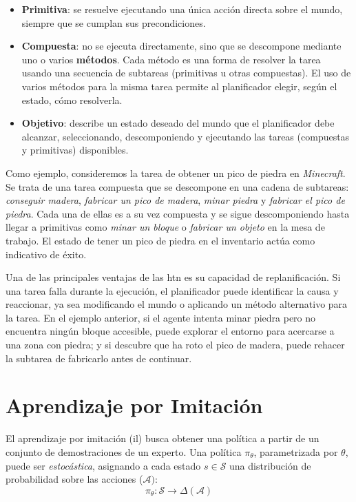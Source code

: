 \begin{itemize}
    \item \textbf{Primitiva}: se resuelve ejecutando una única acción directa sobre el mundo, 
    siempre que se cumplan sus precondiciones.

    \item \textbf{Compuesta}: no se ejecuta directamente, sino que se descompone mediante uno o varios \textbf{métodos}. 
    Cada método es una forma de resolver la tarea usando una secuencia de subtareas (primitivas u otras compuestas). 
    El uso de varios métodos para la misma tarea permite al \gls{planificador} elegir, según el estado, cómo resolverla.

    \item \textbf{Objetivo}: describe un estado deseado del mundo que el \gls{planificador} debe alcanzar, seleccionando, 
    descomponiendo y ejecutando las tareas (compuestas y primitivas) disponibles.
\end{itemize}

Como ejemplo, consideremos la tarea de obtener un pico de piedra en \textit{Minecraft}.
Se trata de una tarea compuesta que se descompone en una cadena de subtareas: \emph{conseguir madera}, 
\emph{fabricar un pico de madera}, \emph{minar piedra} y \emph{fabricar el pico de piedra}.
Cada una de ellas es a su vez compuesta y se sigue descomponiendo hasta llegar a primitivas como \emph{minar un bloque} o 
\emph{fabricar un objeto} en la mesa de trabajo.
El estado de tener un pico de piedra en el inventario actúa como indicativo de éxito.

Una de las principales ventajas de las \gls{htn} es su capacidad de replanificación.
Si una tarea falla durante la ejecución, el \gls{planificador} puede identificar la causa y reaccionar, 
ya sea modificando el mundo o aplicando un método alternativo para la tarea.
En el ejemplo anterior, si el agente intenta minar piedra pero no encuentra ningún bloque accesible, 
puede explorar el entorno para acercarse a una zona con piedra; y si descubre que ha roto el pico de madera, 
puede rehacer la subtarea de fabricarlo antes de continuar.

\section{Aprendizaje por Imitación}
\label{sec:marco-il}
El aprendizaje por imitación (\gls{il}) busca obtener una \gls{política} a partir de un conjunto de demostraciones de un experto.
Una \gls{política} $\pi_\theta$, parametrizada por $\theta$, puede ser \emph{estocástica}, asignando a 
cada estado $s \in \mathcal{S}$ una distribución de probabilidad sobre las acciones ($\mathcal{A})$:
\begin{equation}
    \pi_\theta : \mathcal{S} \rightarrow \Delta(\mathcal{A})
\end{equation}

